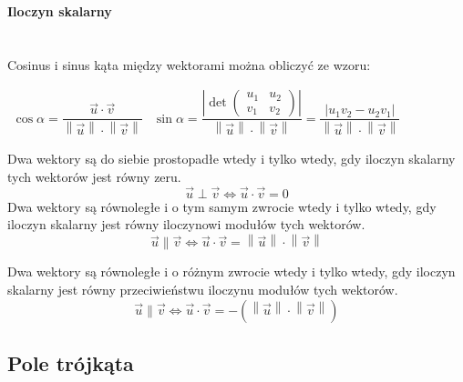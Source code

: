 \documentclass[14pt,a4paper]{extarticle}
\newcommand{\scalemath}[2][4]{\scalebox{#1}{\ensuremath{#2}}}
\newcommand{\Verts}[1]{\left\lVert#1\right\rVert}
\newcommand{\verts}[1]{\left\lvert#1\right\rvert}
\newcommand{\cGreen}[1]{\textcolor{OliveGreen}{#1}}
\newcommand{\cBlue}[1]{\textcolor{NavyBlue}{#1}}
\newcommand{\cOrange}[1]{\textcolor{BurntOrange}{#1}}
\begin{document}
\hfill\break\textbf{Iloczyn skalarny}\\\\\\
\scalemath[1.25]{
\makebox{
   \(
      \begin{array}{>{\hspace{1cm}}c}
      \vec{\cOrange{u}} \cdot \vec{\cGreen{v}} = \cOrange{u_{1}}\cGreen{v_{1}} + \cOrange{u_{2}}\cGreen{v_{2}}\\
      \vec{\cOrange{u}} \cdot \vec{\cGreen{v}} = \Verts{\vec{\cOrange{u}}}\cdot\Verts{\vec{\cGreen{v}}}\cdot\cos\cBlue{\alpha}
      \end{array}
   \)
}}
\MoveBelowBox
\noindent Cosinus i sinus kąta między wektorami można obliczyć ze wzoru:
\begin{center}
\(
   \begin{array}{cc}
   \cos\alpha = \dfrac{\vec{u}\cdot\vec{v}}{\Verts{\vec{u}}\cdot\Verts{\vec{v}}} & \sin\alpha = \dfrac{\verts{\det\left(\begin{smallmatrix}u_{1}&u_{2}\\v_{1}&v_{2}\end{smallmatrix}\right)}}{\Verts{\vec{u}}\cdot\Verts{\vec{v}}} = \dfrac{\verts{u_{1}v_{2}-u_{2}v_{1}}}{\Verts{\vec{u}}\cdot\Verts{\vec{v}}}
   \end{array}
\)
\end{center}
Dwa wektory są do siebie prostopadłe wtedy i tylko wtedy, gdy iloczyn skalarny tych wektorów jest
równy zeru.
$$\vec{u}\perp\vec{v} \Leftrightarrow \vec{u} \cdot \vec{v} = 0$$
Dwa wektory są równoległe i o tym samym zwrocie wtedy i tylko wtedy, gdy iloczyn skalarny jest
równy iloczynowi modułów tych wektorów.
$$\vec{u} \parallel \vec{v} \Leftrightarrow \vec{u} \cdot \vec{v} = \Verts{\vec{u}}\cdot\Verts{\vec{v}}$$

\noindent Dwa wektory są równoległe i o różnym zwrocie wtedy i tylko wtedy, gdy iloczyn skalarny jest
równy przeciwieństwu iloczynu modułów tych wektorów.
$$\vec{u} \parallel \vec{v} \Leftrightarrow \vec{u} \cdot \vec{v} = -(\Verts{\vec{u}}\cdot\Verts{\vec{v}})$$

\subsection{Pole trójkąta}
\end{document}
